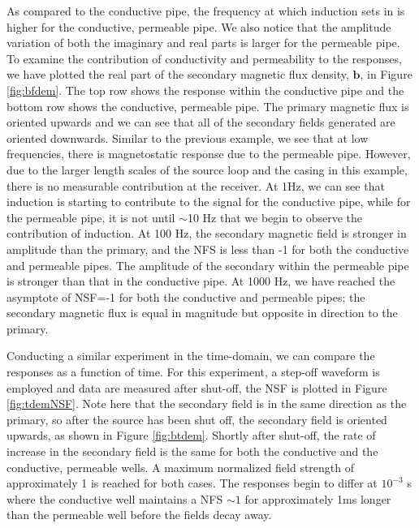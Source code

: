 As compared to the conductive pipe, the frequency at which induction sets in is higher for the conductive, permeable pipe. We also notice that the amplitude variation of both the imaginary and real parts is larger for the permeable pipe. To examine the contribution of conductivity and permeability to the responses, we have plotted the real part of the secondary magnetic flux density, $\mathbf{b}$, in Figure \ref{fig:bfdem}. The top row shows the response within the conductive pipe and the bottom row shows the conductive, permeable pipe. The primary magnetic flux is oriented upwards and we can see that all of the secondary fields generated are oriented downwards. Similar to the previous example, we see that at low frequencies, there is magnetostatic response due to the permeable pipe. However, due to the larger length scales of the source loop and the casing in this example, there is no measurable contribution at the receiver. At 1Hz, we can see that induction is starting to contribute to the signal for the conductive pipe, while for the permeable pipe, it is not until $\sim$10 Hz that we begin to observe the contribution of induction. At 100 Hz, the secondary magnetic field is stronger in amplitude than the primary, and the NFS is less than -1 for both the conductive and permeable pipes. The amplitude of the secondary within the permeable pipe is stronger than that in the conductive pipe. At 1000 Hz, we have reached the asymptote of NSF=-1 for both the conductive and permeable pipes; the secondary magnetic flux is equal in magnitude but opposite in direction to the primary.







Conducting a similar experiment in the time-domain, we can compare the responses as a function of time. For this experiment, a step-off waveform is employed and data are measured after shut-off, the NSF is plotted in Figure \ref{fig:tdemNSF}. Note here that the secondary field is in the same direction as the primary, so after the source has been shut off, the secondary field is oriented upwards, as shown in Figure \ref{fig:btdem}. Shortly after shut-off, the rate of increase in the secondary field is the same for both the conductive and the conductive, permeable wells. A maximum normalized field strength of approximately 1 is reached for both cases. The responses begin to differ at $10^{-3}$ s where the conductive well maintains a NFS $\sim 1$ for approximately 1ms longer than the permeable well before the fields decay away.


